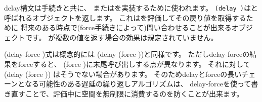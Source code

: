 \begin{entry}{%
}


\semantics
{\cf delay}構文は手続きと共に、
またはを実装するために使われます。
{\tt(delay~)}はと呼ばれるオブジェクトを返します。
これはを評価してその戻り値を取得するために
将来のある時点で({\cf force}手続きによって)問い合わせることが出来るオブジェクトです。
が複数の値を返す場合の効果は規定されていません。

\end{entry}

\begin{entry}{%
}


\semantics
{\cf (delay-force )}式は概念的には
{\cf (delay (force ))}と同様です。
ただし{\cf delay-force}の結果をforceすると、
{\cf (force )}に末尾呼び出しする点が異なります。
それに対して
{\cf (delay (force ))}
はそうでない場合があります。
そのため{\cf delay}と{\cf force}の長いチェーンとなる可能性のある遅延の繰り返しアルゴリズムは、
{\cf delay-force}を使って書き直すことで、評価中に空間を無制限に消費するのを防くことが出来ます。

\end{entry}


